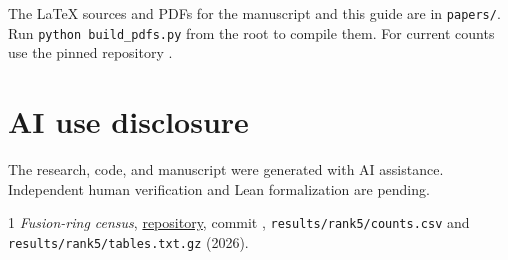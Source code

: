 \documentclass[11pt]{article}
\begin{document}
The LaTeX sources and PDFs for the manuscript and this guide are in
\texttt{papers/}. Run \texttt{python build\_pdfs.py} from the
root to compile them. For current counts use the pinned repository
\cite{Census}.

\section*{AI use disclosure}
The research, code, and manuscript were generated with AI assistance. Independent human verification and Lean formalization are pending.
\begin{thebibliography}{1}
\sloppy
{} \emph{Fusion-ring census},
\href{https://github.com/sebastienpalcoux/fusion-ring-census/tree/b86eb6dc6eeeafe5fc5f6906d7b074e0322e9726}{repository}, commit ,
\texttt{results/rank5/counts.csv} and \texttt{results/rank5/tables.txt.gz} (2026).
\end{thebibliography}
\end{document}
